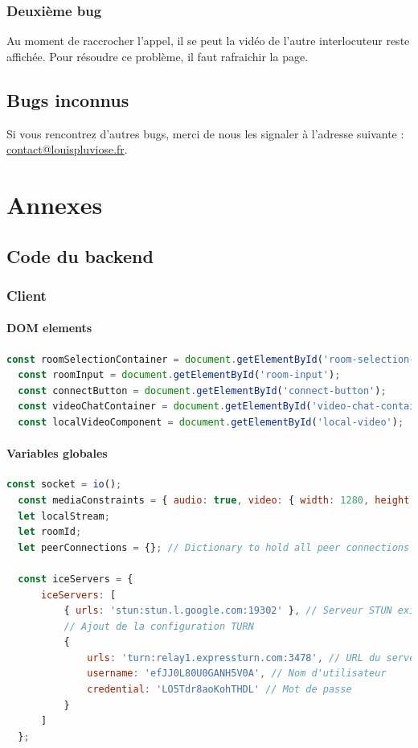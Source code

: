 \documentclass[12pt, a4paper, oneside]{Thesis}
\newcommand{\subsubsubsection}[1]{\paragraph{#1}\mbox{}\par}
\begin{document}
\subsubsection{Deuxième bug}

Au moment de raccrocher l'appel, il se peut la vidéo de l'autre interlocuteur reste affichée. Pour résoudre ce problème, il faut rafraichir la page.\\

\subsection{Bugs inconnus}

Si vous rencontrez d'autres bugs, merci de nous les signaler à l'adresse suivante : \href{mailto:contact@louispluviose.fr}{contact@louispluviose.fr}.\\

\newpage

\section{Annexes}

\subsection{Code du backend}

\subsubsection{Client}

\subsubsubsection{DOM elements}

\begin{lstlisting}[language=JavaScript, caption={DOM Elements}, label=DOM Elements]
  const roomSelectionContainer = document.getElementById('room-selection-container');
  const roomInput = document.getElementById('room-input');
  const connectButton = document.getElementById('connect-button');
  const videoChatContainer = document.getElementById('video-chat-container');
  const localVideoComponent = document.getElementById('local-video');
\end{lstlisting}

\subsubsubsection{Variables globales}

\begin{lstlisting}[language=JavaScript, caption={Variables}, label=Variables]
  const socket = io();
  const mediaConstraints = { audio: true, video: { width: 1280, height: 720 } };
  let localStream;
  let roomId;
  let peerConnections = {}; // Dictionary to hold all peer connections
  
  const iceServers = {
      iceServers: [
          { urls: 'stun:stun.l.google.com:19302' }, // Serveur STUN existant
          // Ajout de la configuration TURN
          {
              urls: 'turn:relay1.expressturn.com:3478', // URL du serveur TURN
              username: 'efJJ0L80U0GANH5V0A', // Nom d'utilisateur
              credential: 'LO5Tdr8aoKohTHDL' // Mot de passe
          }
      ]
  };
\end{lstlisting}
\end{document}
